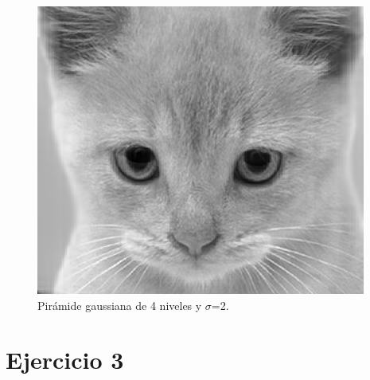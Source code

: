\documentclass[12pt]{article}
\begin{document}
\begin{figure}[H]
\centering
\includegraphics[scale=0.55]{images/GatoReconstruido.png} 
\caption{Pirámide gaussiana de 4 niveles y $\sigma$=2.}
\label{etiqueta}
\end{figure}

\section*{Ejercicio 3}
\end{document}
